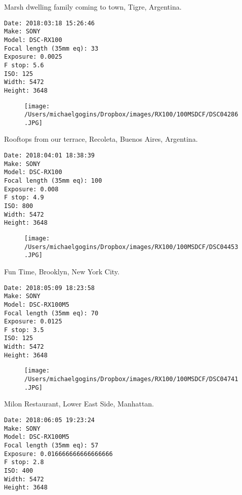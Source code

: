 \documentclass[11pt,letter,DIV=14,paper=landscape]{scrbook}
\begin{document}
\clearpage
\noindent Marsh dwelling family coming to town, Tigre, Argentina.
\noindent
\begin{lstlisting}
Date: 2018:03:18 15:26:46
Make: SONY
Model: DSC-RX100
Focal length (35mm eq): 33
Exposure: 0.0025
F stop: 5.6
ISO: 125
Width: 5472
Height: 3648
\end{lstlisting}
\clearpage

\begin{figure}
\texttt{[image: /Users/michaelgogins/Dropbox/images/RX100/100MSDCF/DSC04286.JPG]}
\end{figure}
    
\clearpage
\noindent Rooftops from our terrace, Recoleta, Buenos Aires, Argentina.
\noindent
\begin{lstlisting}
Date: 2018:04:01 18:38:39
Make: SONY
Model: DSC-RX100
Focal length (35mm eq): 100
Exposure: 0.008
F stop: 4.9
ISO: 800
Width: 5472
Height: 3648
\end{lstlisting}
\clearpage

\begin{figure}
\texttt{[image: /Users/michaelgogins/Dropbox/images/RX100/100MSDCF/DSC04453.JPG]}
\end{figure}
    
\clearpage
\noindent Fun Time, Brooklyn, New York City.
\noindent
\begin{lstlisting}
Date: 2018:05:09 18:23:58
Make: SONY
Model: DSC-RX100M5
Focal length (35mm eq): 70
Exposure: 0.0125
F stop: 3.5
ISO: 125
Width: 5472
Height: 3648
\end{lstlisting}
\clearpage

\begin{figure}
\texttt{[image: /Users/michaelgogins/Dropbox/images/RX100/100MSDCF/DSC04741.JPG]}
\end{figure}
    
\clearpage
\noindent Milon Restaurant, Lower East Side, Manhattan.
\noindent
\begin{lstlisting}
Date: 2018:06:05 19:23:24
Make: SONY
Model: DSC-RX100M5
Focal length (35mm eq): 57
Exposure: 0.016666666666666666
F stop: 2.8
ISO: 400
Width: 5472
Height: 3648
\end{lstlisting}
\clearpage
\end{document}
